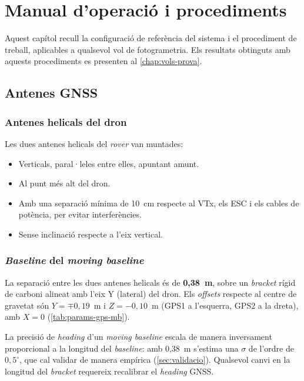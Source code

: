 \chapter{Manual d'operació i procediments}
\label{chap:manual}

Aquest capítol recull la configuració de referència del sistema i el procediment de treball, aplicables a qualsevol vol de fotogrametria. Els resultats obtinguts amb aquests procediments es presenten al \cref{chap:vols-prova}.

\section{Antenes GNSS}
\label{sec:antenes-gnss}

\subsection{Antenes helicals del dron}

Les dues antenes helicals del \emph{rover} van muntades:
\begin{itemize}
    \item Verticals, paral·leles entre elles, apuntant amunt.
    \item Al punt més alt del dron.
    \item Amb una separació mínima de 10~cm respecte al VTx, els ESC i els cables de potència, per evitar interferències.
    \item Sense inclinació respecte a l'eix vertical.
\end{itemize}

\subsection{\emph{Baseline} del \emph{moving baseline}}

La separació entre les dues antenes helicals és de \textbf{0,38~m}, sobre un \emph{bracket} rígid de carboni alineat amb l'eix Y (lateral) del dron. Els \emph{offsets} respecte al centre de gravetat són $Y = \mp 0{,}19$~m i $Z = -0{,}10$~m (GPS1 a l'esquerra, GPS2 a la dreta), amb $X = 0$ (\cref{tab:params-gps-mb}).

La precisió de \emph{heading} d'un \emph{moving baseline} escala de manera inversament proporcional a la longitud del \emph{baseline}: amb 0,38~m s'estima una $\sigma$ de l'ordre de $0{,}5^{\circ}$, que cal validar de manera empírica (\cref{sec:validacio}). Qualsevol canvi en la longitud del \emph{bracket} requereix recalibrar el \emph{heading} GNSS.

